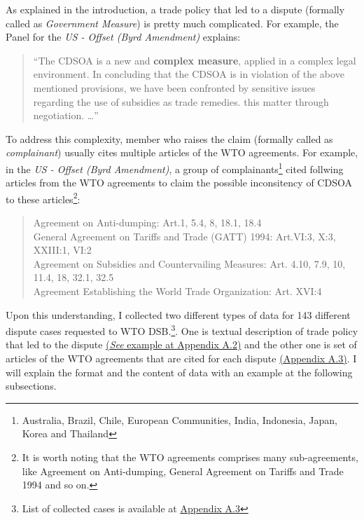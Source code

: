 As explained in the introduction,
a trade policy that led to a dispute (formally called as \textit{Government Measure}) is pretty much complicated.
For example, the Panel for the \textit{US - Offset (Byrd Amendment)} explains:

\begin{quote}
    ``The CDSOA is a new and \textbf{complex measure}, applied in a complex legal environment. In
    concluding that the CDSOA is in violation of the above mentioned provisions, we have been
    confronted by sensitive issues regarding the use of subsidies as trade remedies.
    this matter through negotiation. \ldots''
\end{quote}

\noindent To address this complexity, member who raises the claim (formally called as \textit{complainant}) usually cites multiple articles of the WTO agreements. For example, in the
\textit{US - Offset (Byrd Amendment)},
a group of complainants\footnote{Australia,
    Brazil,
    Chile,
    European Communities,
    India,
    Indonesia,
    Japan,
    Korea and Thailand}
cited follwing articles from the WTO agreements to claim the possible inconsitency of CDSOA to these articles\footnote{It is worth noting that the WTO agreements comprises many sub-agreements, like Agreement on Anti-dumping, General Agreement on Tariffs and Trade 1994 and so on.}:

\begin{quote}
    Agreement on Anti-dumping: Art.1, 5.4, 8, 18.1, 18.4\\
    General Agreement on Tariffs and Trade (GATT) 1994: Art.VI:3, X:3, XXIII:1, VI:2 \\
    Agreement on Subsidies and Countervailing Measures: Art. 4.10, 7.9, 10, 11.4, 18, 32.1, 32.5\\
    Agreement Establishing the World Trade Organization: Art. XVI:4
\end{quote}

\noindent Upon this understanding, 
I collected two different types of data for 143 different dispute cases requested to WTO DSB.\footnote{List of collected cases is
    available at \hyperref[sub:cited-articles-table]{Appendix A.3}
}.
One is textual description of trade policy
that led to the dispute \hyperref[sub:factual-aspect-example]{(\textit{See} example at Appendix A.2)} and the other one is
set of articles of the WTO agreements that are
cited for each dispute \hyperref[sub:cited-articles-table]{(Appendix A.3)}.
I will explain the format and the content of
data with an example at the following subsections.

